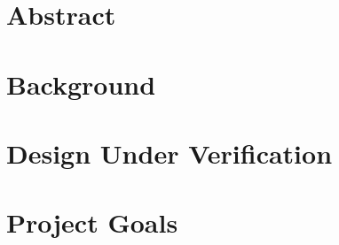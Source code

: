 \documentclass{article}
\begin{document}
    \section{Abstract}
    
    \section{Background}
    
    \section{Design Under Verification}

    \section{Project Goals}
    
    \pagebreak
    \small
    {}
    
\end{document}
